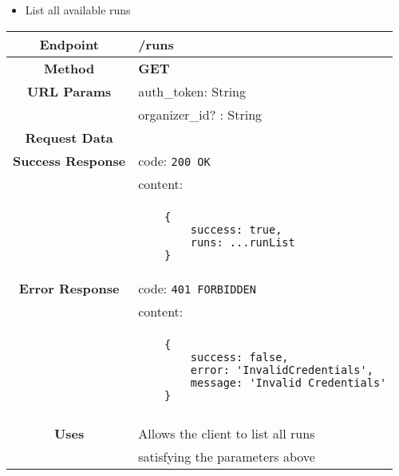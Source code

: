     \begin{itemize}
            \item List all available runs
        \end{itemize}
        \begin{adjustwidth}{1cm}{}
            \begin{longtable}{|c|l|}
                \hline
                \textbf{Endpoint} & /runs \\
                \hline
                \textbf{Method} & \textbf{GET} \\
                \hline
                \textbf{URL Params} &  auth\_token:  String \\
                &                      organizer\_id? : String\\
                \hline
                \textbf{Request Data} &  \\
                \hline
                \textbf{Success Response} & code: \texttt{200 OK} \\
                &                           content: \\
                & \begin{minipage}[t]{0.5\textwidth}
                    \begin{adjustwidth}{1.5cm}{}
                    \begin{verbatim}
    {
        success: true, 
        runs: ...runList
    }
                    \end{verbatim}
                    \end{adjustwidth}
                  \end{minipage} \\
                  \hline
                \textbf{Error Response} &  code: \texttt{401 FORBIDDEN} \\
                &                         content: \\
                & \begin{minipage}[t]{0.7\textwidth}
                    \begin{adjustwidth}{1.5cm}{}
                    \begin{verbatim}
    {
        success: false, 
        error: 'InvalidCredentials',
        message: 'Invalid Credentials'
    }
                    \end{verbatim}
                    \end{adjustwidth}
                  \end{minipage} \\\\
                  \hline
                \textbf{Uses} & Allows the client to list all runs\\ 
                              &  satisfying the parameters above \\
                \hline
                

\end{longtable}
\end{adjustwidth}

